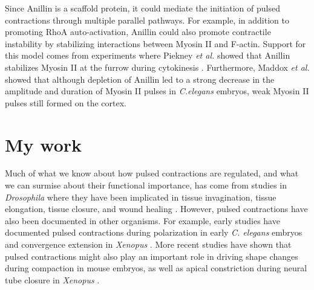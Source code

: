 \documentclass{ucetd}
\begin{document}
Since Anillin is a scaffold protein, it could mediate the initiation of pulsed contractions through multiple parallel pathways.  For example, in addition to promoting RhoA auto-activation, Anillin  could also promote contractile instability by stabilizing interactions between Myosin II and F-actin.  Support for this model comes from experiments where Piekney \textit{et al.} showed that Anillin stabilizes Myosin II at the furrow during cytokinesis \cite{Piekny:2008jf}.  Furthermore, Maddox \textit{et al.} showed that although depletion of Anillin led to a strong decrease in the amplitude and duration of Myosin II pulses in \textit{C.elegans} embryos, weak Myosin II pulses still formed on the cortex.



\section{My work}
Much of what we know about how pulsed contractions are regulated, and what we can surmise about their functional importance, has come from studies in \textit{Drosophila} where they have been implicated in tissue invagination, tissue elongation, tissue closure, and wound healing \cite{Martin:2009du,Rauzi:2010fs, Solon:2009hg, Razzell:2014eb}.   However, pulsed contractions have also been documented in other organisms.  For example, early studies have documented pulsed contractions during polarization in early \textit{C. elegans} embryos and convergence extension in \textit{Xenopus}  \cite{Munro:2004jk, He:2010gf}.  More recent studies have shown that pulsed contractions might also play an important role in driving shape changes during compaction in mouse embryos, as well as apical constriction during neural tube closure in \textit{Xenopus} \cite{Maitre:2015hc, Christodoulou:2015kb}. 
\end{document}
